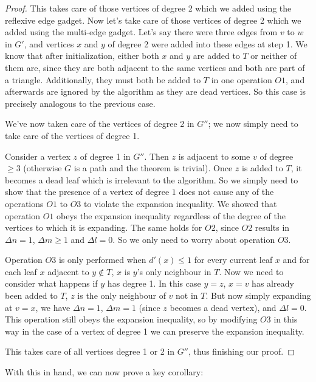 \documentclass[11pt]{report}
\begin{document}
\begin{proof}
This takes care of those vertices of degree 2 which we added using the reflexive edge gadget. Now let's take care of those vertices of degree 2 which we added using the multi-edge gadget. Let's say there were three edges from $v$ to $w$ in $G'$, and vertices $x$ and $y$ of degree 2 were added into these edges at step 1. We know that after initialization, either both $x$ and $y$ are added to $T$ or neither of them are, since they are both adjacent to the same vertices and both are part of a triangle. Additionally, they must both be added to $T$  in one operation $O1$, and afterwards are ignored by the algorithm as they are dead vertices. So this case is precisely analogous to the previous case.






We've now taken care of the vertices of degree 2 in $G''$; we now simply need to take care of the vertices of degree 1.

Consider a vertex $z$ of degree 1 in $G''$. Then $z$ is adjacent to some $v$ of degree $\geq 3$ (otherwise $G$ is a path and the theorem is trivial). Once $z$ is added to $T$, it becomes a dead leaf which is irrelevant to the algorithm. So we simply need to show that the presence of a vertex of degree $1$ does not cause any of the operations $O1$ to $O3$ to violate the expansion inequality. We showed that operation $O1$ obeys the expansion inequality regardless of the degree of the vertices to which it is expanding. The same holds for $O2$, since $O2$ results in $\Delta n =1$, $\Delta m \geq 1$ and $\Delta l =0$. So we only need to worry about operation $O3$. 

Operation $O3$ is only performed when $d'(x)\leq 1$ for every current leaf $x$ and for each leaf $x$ adjacent to $y\notin T$, $x$ is $y$'s only neighbour in $T$. Now we need to consider what happens if $y$ has degree 1. In this case $y=z$, $x=v$ has already been added to $T$, $z$ is the only neighbour of $v$ not in $T$. But now simply expanding at $v=x$, we have $\Delta n =1$, $\Delta m = 1$ (since $z$ becomes a dead vertex), and $\Delta l = 0$. This operation still obeys the expansion inequality, so by modifying $O3$ in this way in the case of a vertex of degree 1 we can preserve the expansion inequality.

This takes care of all vertices degree 1 or 2 in $G''$, thus finishing our proof.

\end{proof}

With this in hand, we can now prove a key corollary:
\end{document}
